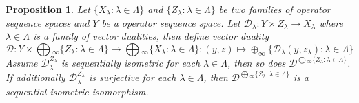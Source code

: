 \documentclass[12pt]{article}
\newtheorem{proposition}[theorem]{Proposition}
\begin{document}
\begin{proposition}\label{PrVectDualProdComp} Let $\{X_\lambda:\lambda\in\Lambda\}$ and $\{Z_\lambda:\lambda\in\Lambda\}$ be two families of operator sequence spaces and $Y$ be a operator sequence space. Let $\mathcal{D}_\lambda: Y\times Z_\lambda\to X_\lambda$ where $\lambda\in\Lambda$ is a family of vector dualities, then define vector duality
$$
\mathcal{D}:Y\times\bigoplus{}_\infty\{Z_\lambda:\lambda\in\Lambda\}\to\bigoplus{}_\infty\{X_\lambda:\lambda\in\Lambda\}:(y,z)\mapsto\oplus_\infty\{\mathcal{D}_\lambda(y,z_\lambda):\lambda\in\Lambda\}
$$
Assume $\mathcal{D}_\lambda^{Z_\lambda}$ is sequentially isometric for each $\lambda\in\Lambda$, then so does $\mathcal{D}^{\bigoplus{}_\infty\{Z_\lambda:\lambda\in\Lambda\}}$. If additionally $\mathcal{D}_\lambda^{Z_\lambda}$ is surjective for each $\lambda\in\Lambda$, then $\mathcal{D}^{\bigoplus{}_\infty\{Z_\lambda:\lambda\in\Lambda\}}$ is a sequential isometric isomorphism.
\end{proposition}
\end{document}
